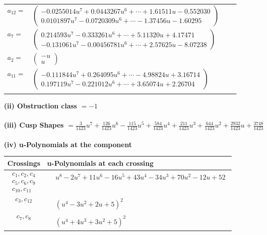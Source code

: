 \documentclass[1p]{elsarticle_modified}
\theoremstyle{definition}
\begin{document}
\begin{tabular}{m{7pt} m{180pt} m{7pt} m{180pt} }
\flushright $a_{12}=$&$\begin{pmatrix}-0.0255014 u^{7}+0.0443267 u^{6}+\cdots+1.61511 u-0.552030\\0.0101897 u^{7}-0.0720309 u^{6}+\cdots-1.37456 u-1.60295\end{pmatrix}$ \\
\flushright $a_{7}=$&$\begin{pmatrix}0.214593 u^{7}-0.333261 u^{6}+\cdots+5.11320 u+4.17471\\-0.131061 u^{7}-0.00456781 u^{6}+\cdots+2.57625 u-8.07238\end{pmatrix}$ \\
\flushright $a_{2}=$&$\begin{pmatrix}- u\\u\end{pmatrix}$ \\
\flushright $a_{11}=$&$\begin{pmatrix}-0.111844 u^{7}+0.264095 u^{6}+\cdots-4.98824 u+3.16714\\0.197119 u^{7}-0.221012 u^{6}+\cdots+3.65074 u+2.26704\end{pmatrix}$\\&\end{tabular}
\flushleft \textbf{(ii) Obstruction class $= -1$}\\~\\
\flushleft \textbf{(iii) Cusp Shapes $= \frac{3}{1423} u^7+\frac{126}{1423} u^6-\frac{115}{1423} u^5+\frac{584}{1423} u^4+\frac{211}{1423} u^3+\frac{644}{1423} u^2+\frac{2932}{1423} u+\frac{3748}{1423}$}\\~\\
\newpage\renewcommand{\arraystretch}{1}
\flushleft \textbf{(iv) u-Polynomials at the component}\newline \\
\begin{tabular}{m{50pt}|m{274pt}}
Crossings & \hspace{64pt}u-Polynomials at each crossing \\
\hline $$\begin{aligned}c_{1},c_{2},c_{4}\\c_{5},c_{6},c_{9}\\c_{10},c_{11}\end{aligned}$$&$\begin{aligned}
&u^8-2 u^7+11 u^6-16 u^5+43 u^4-34 u^3+70 u^2-12 u+52
\end{aligned}$\\
\hline $$\begin{aligned}c_{3},c_{12}\end{aligned}$$&$\begin{aligned}
&(u^4-3 u^2+2 u+5)^2
\end{aligned}$\\
\hline $$\begin{aligned}c_{7},c_{8}\end{aligned}$$&$\begin{aligned}
&(u^4+4 u^3+3 u^2+5)^2
\end{aligned}$\\
\hline
\end{tabular}\\~\\
\end{document}

